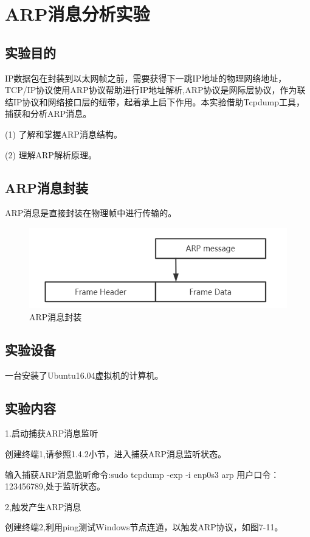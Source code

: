 \documentclass[lang=cn,11pt,a4paper,cite=authoryear]{elegantpaper}
\begin{document}
\section{ARP消息分析实验}
\subsection{实验目的}

IP数据包在封装到以太网帧之前，需要获得下一跳IP地址的物理网络地址，TCP/IP协议使用ARP协议帮助进行IP地址解析,ARP协议是网际层协议，作为联结IP协议和网络接口层的纽带，起着承上启下作用。本实验借助Tcpdump工具，捕获和分析ARP消息。

(1)	了解和掌握ARP消息结构。

(2)	理解ARP解析原理。

\subsection{ARP消息封装}

ARP消息是直接封装在物理帧中进行传输的。

\begin{figure}[htbp]
	\centering
	\includegraphics[width=0.7\linewidth]{image/screenshot048}
	\caption{ARP消息封装}
	\label{fig:screenshot048}
\end{figure}


\subsection{实验设备}

一台安装了Ubuntu16.04虚拟机的计算机。


\subsection{实验内容}

1.启动捕获ARP消息监听

创建终端1,请参照1.4.2小节，进入捕获ARP消息监听状态。


输入捕获ARP消息监听命令:sudo tcpdump -exp -i enp0s3 arp 用户口令：123456789,处于监听状态。

2,触发产生ARP消息

创建终端2,利用ping测试Windows节点连通，以触发ARP协议，如图7-11。
\end{document}
